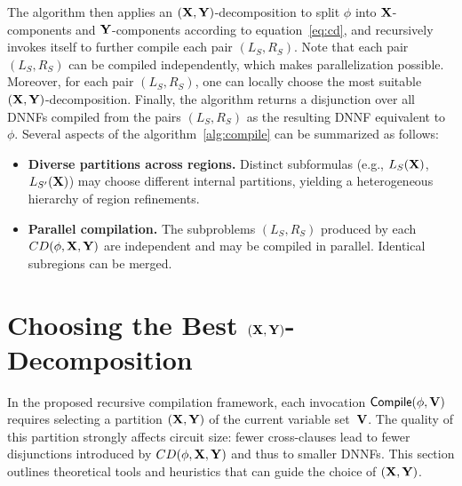 The algorithm then applies an $(\mathbf{X},\mathbf{Y})$-decomposition to split $\phi$
into $\mathbf{X}$-components and $\mathbf{Y}$-components according to equation~\eqref{eq:cd}, 
and recursively invokes itself to further compile each pair $(L_{S}, R_{S})$.
Note that each pair $(L_{S}, R_{S})$ can be compiled independently, which makes parallelization possible.
Moreover, for each pair $(L_{S}, R_{S})$, one can locally choose the most suitable $(\mathbf{X}, \mathbf{Y})$-decomposition.
Finally, the algorithm returns a disjunction over all DNNFs compiled from the pairs $(L_{S}, R_{S})$ as the resulting DNNF equivalent to $\phi$.
Several aspects of the algorithm~\ref{alg:compile} can be summarized as follows:
\begin{itemize}
\item \textbf{Diverse partitions across regions.}
Distinct subformulas (e.g., $L_{S}(\mathbf{X})$, $L_{S'}(\mathbf{X})$) may choose
different internal partitions, yielding a heterogeneous
hierarchy of region refinements.
\item \textbf{Parallel compilation.}
The subproblems $(L_{S},R_{S})$ produced by each
$CD(\phi,\mathbf{X},\mathbf{Y})$ are independent and may be compiled in
parallel.  Identical subregions can be merged.
\end{itemize}



\section{Choosing the Best $(\mathbf{X},\mathbf{Y})$-Decomposition}
%
In the proposed recursive compilation framework, each invocation
$\mathsf{Compile}(\phi,\mathbf{V})$ requires selecting a partition
$(\mathbf{X},\mathbf{Y})$ of the current variable set~$\mathbf{V}$.
The quality of this partition strongly affects circuit size:
fewer cross-clauses lead to fewer disjunctions introduced by
$CD(\phi,\mathbf{X},\mathbf{Y})$ and thus to smaller DNNFs.
This section outlines theoretical tools and heuristics that can guide
the choice of $(\mathbf{X},\mathbf{Y})$.



